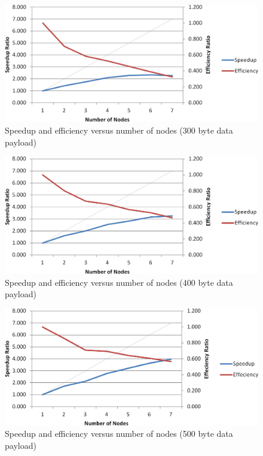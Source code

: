 \begin{appendices}
\begin{figure}[ptb]
	\begin{centering}
		\includegraphics[width=6in]{Appendices/Figures/appendices-convolution_results_300.png}
		\caption{Speedup and efficiency versus number of nodes (300 byte data payload)}
		\label{fig:appendices:convolution_results_300}
	\end{centering}
\end{figure}

\begin{figure}[ptb]
	\begin{centering}
		\includegraphics[width=6in]{Appendices/Figures/appendices-convolution_results_400.png}
		\caption{Speedup and efficiency versus number of nodes (400 byte data payload)}
		\label{fig:appendices:convolution_results_400}
	\end{centering}
\end{figure}

\begin{figure}[ptb]
	\begin{centering}
		\includegraphics[width=6in]{Appendices/Figures/appendices-convolution_results_500.png}
		\caption{Speedup and efficiency versus number of nodes (500 byte data payload)}
		\label{fig:appendices:convolution_results_500}
	\end{centering}
\end{figure}


\end{appendices}
